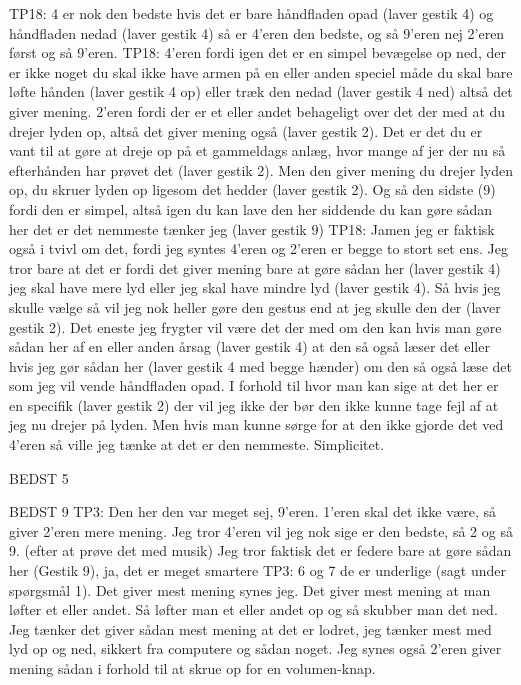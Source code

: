 TP18: 4 er nok den bedste hvis det er bare håndfladen opad (laver gestik 4) og håndfladen nedad (laver gestik 4) så er 4’eren den bedste, og så 9’eren nej 2’eren først og så 9’eren. 
TP18: 4’eren fordi igen det er en simpel bevægelse op ned, der er ikke noget du skal ikke have armen på en eller anden speciel måde du skal bare løfte hånden (laver gestik 4 op) eller træk den nedad (laver gestik 4 ned) altså det giver mening. 2’eren fordi der er et eller andet behageligt over det der med at du drejer lyden op, altså det giver mening også (laver gestik 2).  Det er det du er vant til at gøre at dreje op på et gammeldags anlæg, hvor mange af jer der nu så efterhånden har prøvet det (laver gestik 2). Men den giver mening du drejer lyden op, du skruer lyden op ligesom det hedder (laver gestik 2). Og så den sidste (9) fordi den er simpel, altså igen du kan lave den her siddende du kan gøre sådan her det er det nemmeste tænker jeg (laver gestik 9)
TP18:  Jamen jeg er faktisk også i tvivl om det, fordi jeg syntes 4’eren og 2’eren er begge to stort set ens. Jeg tror bare at det er fordi det giver mening bare at gøre sådan her (laver gestik 4) jeg skal have mere lyd eller jeg skal have mindre lyd (laver gestik 4). Så hvis jeg skulle vælge så vil jeg nok heller gøre den gestus end at jeg skulle den der (laver gestik 2). Det eneste jeg frygter vil være det der med om den kan hvis man gøre sådan her af en eller anden årsag (laver gestik 4) at den så også læser det eller hvis jeg gør sådan her (laver gestik 4 med begge hænder) om den så også læse det som jeg vil vende håndfladen opad. I forhold til hvor man kan sige at det her er en specifik (laver gestik 2) der vil jeg ikke der bør den ikke kunne tage fejl af at jeg nu drejer på lyden. Men hvis man kunne sørge for at den ikke gjorde det ved 4’eren så ville jeg tænke at det er den nemmeste. Simplicitet. 


 


BEDST 5 

BEDST 9 
TP3: Den her den var meget sej, 9’eren. 1’eren skal det ikke være, så giver 2’eren mere mening. Jeg tror 4’eren vil jeg nok sige er den bedste, så 2 og så 9. (efter at prøve det med musik) Jeg tror faktisk det er federe bare at gøre sådan her (Gestik 9), ja, det er meget smartere
TP3: 6 og 7 de er underlige (sagt under spørgsmål 1). Det giver mest mening synes jeg. Det giver mest mening at man løfter et eller andet. Så løfter man et eller andet op og så skubber man det ned. Jeg tænker det giver sådan mest mening at det er lodret, jeg tænker mest med lyd op og ned, sikkert fra computere og sådan noget. Jeg synes også 2’eren giver mening sådan i forhold til at skrue op for en volumen-knap.

